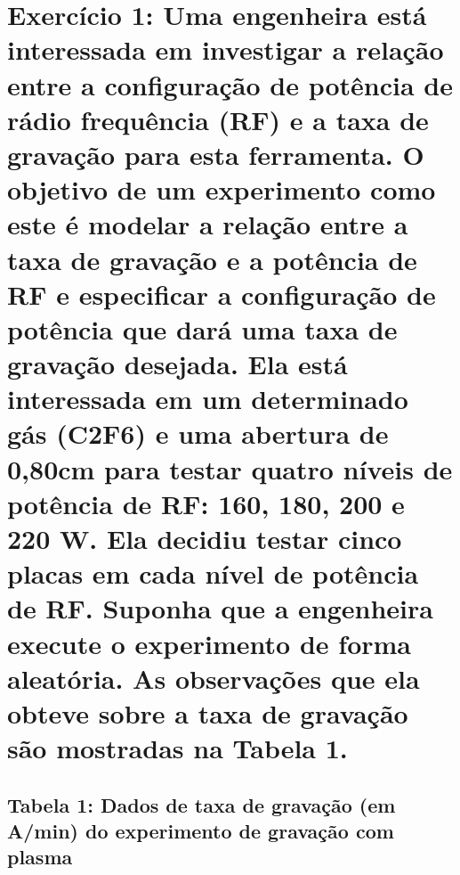 \documentclass[
  a4paper]{article}
\begin{document}
\hypertarget{exercuxedcio-1-uma-engenheira-estuxe1-interessada-em-investigar-a-relauxe7uxe3o-entre-a-configurauxe7uxe3o-de-potuxeancia-de-ruxe1dio-frequuxeancia-rf-e-a-taxa-de-gravauxe7uxe3o-para-esta-ferramenta.-o-objetivo-de-um-experimento-como-este-uxe9-modelar-a-relauxe7uxe3o-entre-a-taxa-de-gravauxe7uxe3o-e-a-potuxeancia-de-rf-e-especificar-a-configurauxe7uxe3o-de-potuxeancia-que-daruxe1-uma-taxa-de-gravauxe7uxe3o-desejada.-ela-estuxe1-interessada-em-um-determinado-guxe1s-c2f6-e-uma-abertura-de-080cm-para-testar-quatro-nuxedveis-de-potuxeancia-de-rf-160-180-200-e-220-w.-ela-decidiu-testar-cinco-placas-em-cada-nuxedvel-de-potuxeancia-de-rf.-suponha-que-a-engenheira-execute-o-experimento-de-forma-aleatuxf3ria.-as-observauxe7uxf5es-que-ela-obteve-sobre-a-taxa-de-gravauxe7uxe3o-suxe3o-mostradas-na-tabela-1.}{%
\section{Exercício 1: Uma engenheira está interessada em investigar a
relação entre a configuração de potência de rádio frequência (RF) e a
taxa de gravação para esta ferramenta. O objetivo de um experimento como
este é modelar a relação entre a taxa de gravação e a potência de RF e
especificar a configuração de potência que dará uma taxa de gravação
desejada. Ela está interessada em um determinado gás (C2F6) e uma
abertura de 0,80cm para testar quatro níveis de potência de RF: 160,
180, 200 e 220 W. Ela decidiu testar cinco placas em cada nível de
potência de RF. Suponha que a engenheira execute o experimento de forma
aleatória. As observações que ela obteve sobre a taxa de gravação são
mostradas na Tabela
1.}\label{exercuxedcio-1-uma-engenheira-estuxe1-interessada-em-investigar-a-relauxe7uxe3o-entre-a-configurauxe7uxe3o-de-potuxeancia-de-ruxe1dio-frequuxeancia-rf-e-a-taxa-de-gravauxe7uxe3o-para-esta-ferramenta.-o-objetivo-de-um-experimento-como-este-uxe9-modelar-a-relauxe7uxe3o-entre-a-taxa-de-gravauxe7uxe3o-e-a-potuxeancia-de-rf-e-especificar-a-configurauxe7uxe3o-de-potuxeancia-que-daruxe1-uma-taxa-de-gravauxe7uxe3o-desejada.-ela-estuxe1-interessada-em-um-determinado-guxe1s-c2f6-e-uma-abertura-de-080cm-para-testar-quatro-nuxedveis-de-potuxeancia-de-rf-160-180-200-e-220-w.-ela-decidiu-testar-cinco-placas-em-cada-nuxedvel-de-potuxeancia-de-rf.-suponha-que-a-engenheira-execute-o-experimento-de-forma-aleatuxf3ria.-as-observauxe7uxf5es-que-ela-obteve-sobre-a-taxa-de-gravauxe7uxe3o-suxe3o-mostradas-na-tabela-1.}}

\hypertarget{tabela-1-dados-de-taxa-de-gravauxe7uxe3o-em-amin-do-experimento-de-gravauxe7uxe3o-com-plasma}{%
\subsection{Tabela 1: Dados de taxa de gravação (em A/min) do
experimento de gravação com
plasma}\label{tabela-1-dados-de-taxa-de-gravauxe7uxe3o-em-amin-do-experimento-de-gravauxe7uxe3o-com-plasma}}
\end{document}
